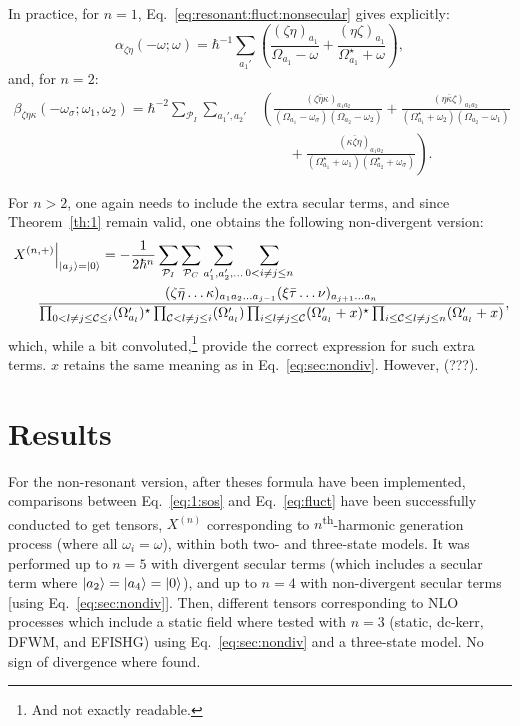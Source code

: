 \documentclass[12pt,a4paper]{article}
\begin{document}
In practice, for $n=1$, Eq.~\eqref{eq:resonant:fluct:nonsecular} gives explicitly:\begin{equation*}
	\alpha_{\zeta\eta}(-\omega; \omega) = \hbar^{-1} \sum_{a_1'} \left(\frac{(\zeta\eta)_{a_1}}{\Omega_{a_1} - \omega}+ \frac{(\eta\zeta)_{a_1}}{\Omega_{a_1}^\star + \omega}\right),
	\end{equation*}
	and, for $n=2$:
	\begin{align*}
	\beta_{\zeta\eta\kappa}(-\omega_\sigma; \omega_1, \omega_2) = \hbar^{-2} \sum_{\mathcal{P}_I} \sum_{a_1', a_2'} &\left(\frac{(\zeta\bar{\eta}\kappa)_{a_1 a_2}}{(\Omega_{a_1} - \omega_\sigma)(\Omega_{a_2} - \omega_2)}+ \frac{(\eta\bar\kappa\zeta)_{a_1 a_2}}{(\Omega_{a_1}^\star +\omega_2)(\Omega_{a_2} -\omega_1)}\right.\\
	&\hspace{2em}+\left.\frac{(\kappa\bar\zeta\eta)_{a_1 a_2}}{(\Omega_{a_1}^\star + \omega_1)(\Omega_{a_2}^\star + \omega_\sigma)} \right).
\end{align*}

For $n>2$, one again needs to include the extra secular terms, and since  Theorem~\ref{th:1}  remain valid, one obtains the following non-divergent version:\begin{align}
	&\left. X^{(n,+)} \right|_{\ket{a_j} = \ket{0}} = -\frac{1}{2\hbar^n} \sum_{\mathcal{P}_I} \sum_{\mathcal{P}_C}\sum_{a_1', a_2', \ldots} \sum_{0 < i \neq j \leq n} \nonumber\\
	&\hspace{2em}\frac{(\zeta \bar{\eta} \ldots \kappa)_{a_1 a_2 \ldots a_{j-1}} (\xi \bar{\tau} \ldots \nu)_{a_{j+1} \ldots a_n}}{\prod_{0 < l \neq j \leq \mathcal C \leq i} (\Omega'_{a_l})^\star \prod_{ \mathcal C < l \neq j \leq i} (\Omega'_{a_l}) \prod_{i \leq l \neq j \leq  \mathcal C} (\Omega'_{a_l} + x)^\star \prod_{i\leq \mathcal C \leq l \neq j \leq  n} (\Omega'_{a_l} + x)}, \label{eq:resonant:sec:nondiv}
\end{align}
which, while a bit convoluted,\footnote{And not exactly readable.} provide the correct expression for such extra terms. $x$ retains the same meaning as in Eq.~\eqref{eq:sec:nondiv}. However, (???).

\section{Results}

For the non-resonant version, after theses formula have been implemented, comparisons between Eq.~\eqref{eq:1:sos} and Eq.~\eqref{eq:fluct} have been successfully conducted to get tensors, $X^{(n)}$ corresponding to $n$\textsuperscript{th}-harmonic generation process (where all $\omega_i = \omega$), within both two- and three-state models.
It was performed up to  $n = 5$ with divergent secular terms (which includes a secular term where $\ket{a_2} = \ket{a_4} = \ket{0}$), and up to $n=4$ with non-divergent secular terms [using Eq.~\eqref{eq:sec:nondiv}]. Then, different tensors corresponding to NLO processes which include a static field where tested with $n=3$ (static, dc-kerr, DFWM, and EFISHG) using Eq.~\eqref{eq:sec:nondiv} and a three-state model. No sign of divergence where found.
\end{document}
